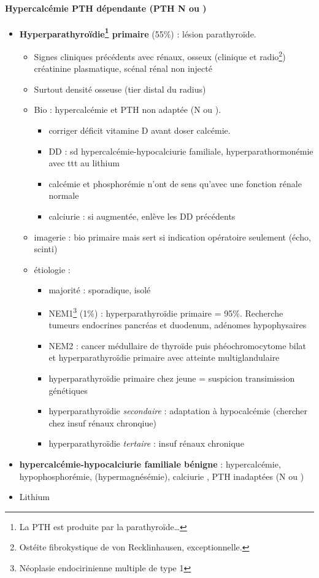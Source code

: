 \documentclass[11pt]{article}
\begin{document}
\paragraph{Hypercalcémie PTH dépendante (PTH N ou \inc)}
\label{sec:orgd7171a2}
\begin{itemize}
\item \textbf{Hyperparathyroïdie\footnote{La PTH est produite par la parathyroïde\ldots{}} primaire} (55\%) : lésion parathyroïde. 
\begin{itemize}
\item Signes cliniques précédents avec rénaux, osseux (clinique et radio\footnote{Ostéite fibrokystique de von Recklinhausen, exceptionnelle.}) \thus créatinine
plasmatique, scénal rénal non injecté
\item Surtout densité osseuse (tier distal du radius)
\item Bio : hypercalcémie et PTH non adaptée (N ou \inc). 
\begin{itemize}
\item \danger corriger déficit vitamine D avant doser calcémie.
\item \danger DD : sd hypercalcémie-hypocalciurie familiale,
hyperparathormonémie avec ttt au lithium
\item calcémie et phosphorémie n'ont de sens qu'avec une fonction rénale normale
\item calciurie : si augmentée, enlève les DD précédents
\end{itemize}
\item imagerie : bio primaire mais sert si indication opératoire seulement (écho, scinti)
\item étiologie :
\begin{itemize}
\item majorité : sporadique, isolé
\item NEM1\footnote{Néoplasie endocirinienne multiple de type 1} (1\%) : hyperparathyroïdie primaire = 95\%. Recherche tumeurs
endocrines pancréas et duodenum, adénomes hypophysaires
\item NEM2 : cancer médullaire de thyroïde puis phéochromocytome bilat et
hyperparathyroïdie primaire avec atteinte multiglandulaire
\item \danger hyperparathyroïdie primaire chez jeune = suspicion transimission
génétiques
\item hyperparathyroïdie \emph{secondaire} : adaptation à hypocalcémie (chercher chez
insuf rénaux chronqiue)
\item hyperparathyroïdie \emph{tertaire} : insuf rénaux chronique
\end{itemize}
\end{itemize}
\item \textbf{hypercalcémie-hypocalciurie familiale bénigne} : hypercalcémie,
hypophosphorémie, (hypermagnésémie), calciurie \dec\dec{}, PTH inadaptées
(N ou \inc)
\item Lithium
\end{itemize}
\end{document}
